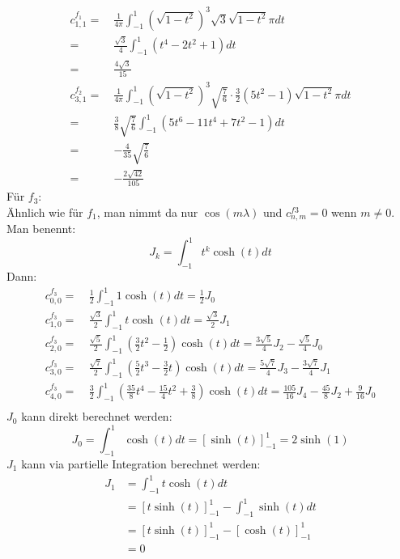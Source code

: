 \begin{align}
	c_{1,1}^{f_1} = \ & \frac{1}{4\pi}\int_{-1}^{1}(\sqrt{1-t^2})^3\sqrt{3}\sqrt{1-t^2}\pi dt\\
	= \ & \frac{\sqrt{3}}{4} \int_{-1}^{1} (t^4 - 2t^2 +1)dt \\
	= \ & \frac{4\sqrt{3}}{15} \\
	c_{3,1}^{f_2} = \ & \frac{1}{4\pi}\int_{-1}^{1}(\sqrt{1-t^2})^3\sqrt{\frac{7}{6}}\cdot \frac{3}{2}(5t^2-1)\sqrt{1-t^2} \pi dt \\
	= \ & \frac{3}{8}\sqrt{\frac{7}{6}}\int_{-1}^{1}(5t^6 - 11t^4 + 7t^2-1) dt \\
	= \ & -\frac{4}{35} \sqrt{\frac{7}{6}} \\ 
	= \ & -\frac{2\sqrt{42}}{105}
\end{align}
Für $f_3$:\\
Ähnlich wie für $f_1$, man nimmt da nur $\cos(m\lambda)$ und $c_{n,m}^{f3} = 0$ wenn $m \neq 0$. Man benennt:
\begin{equation*}
	J_k = \int_{-1}^{1} t^k \cosh (t) dt
\end{equation*}
Dann:
\begin{align}
	c_{0,0}^{f_3} = \ & \frac{1}{2} \int_{-1}^{1} 1 \cosh (t) dt = \frac{1}{2} J_0 \\
	c_{1,0}^{f_3} = \ & \frac{\sqrt{3}}{2} \int_{-1}^{1} t \cosh (t) dt = \frac{\sqrt{3}}{2}J_1 \\
	c_{2,0}^{f_3} = \ & \frac{\sqrt{5}}{2} \int_{-1}^{1} (\frac{3}{2}t^2-\frac{1}{2})\cosh (t) dt = \frac{3\sqrt{5}}{4}J_2-\frac{\sqrt{5}}{4} J_0 \\
	c_{3,0}^{f_3} = \ & \frac{\sqrt{7}}{2} \int_{-1}^{1} (\frac{5}{2}t^3 - \frac{3}{2}t)\cosh (t) dt = \frac{5\sqrt{7}}{4}J_3 - \frac{3\sqrt{7}}{4} J_1 \\
	c_{4,0}^{f_3} = \ & \frac{3}{2} \int_{-1}^{1} (\frac{35}{8}t^4 - \frac{15}{4}t^2 + \frac{3}{8}) \cosh (t) dt = \frac{105}{16}J_4 - \frac{45}{8}J_2 + \frac{9}{16}J_0 \\
\end{align}
$J_0$ kann direkt berechnet werden:
\begin{equation}
	J_0 = \int_{-1}^{1} \cosh (t)dt = \left[\sinh(t)\right]^1_{-1} = 2\sinh(1)
\end{equation}
$J_1$ kann via partielle Integration berechnet werden:
\begin{align}
	J_1 & = \int_{-1}^{1} t \cosh(t) dt \\
	 	& = \left[t\sinh(t)\right]^{1}_{-1} - \int_{-1}^{1} \sinh(t) dt \\
	 	& = \left[t\sinh(t)\right]^{1}_{-1} - \left[\cosh(t)\right]^{1}_{-1} \\
	 	& = 0
\end{align}
